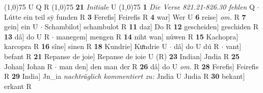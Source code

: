 \documentclass[8pt,a4paper,notitlepage]{article}
\begin{document}
\begin{table}[ht]
\begin{minipage}[t]{0.5\linewidth}
\scriptsize
\line(1,0){75} \newline
U Q R \newline
\line(1,0){75} \newline
\textbf{21} \textit{Initiale} U  \newline
\line(1,0){75} \newline
\textbf{1} \textit{Die Verse 821.21-826.30 fehlen} Q   $\cdot$ Lútte ein teil sẏ funden R \textbf{3} Ferefis] Feirefis R \textbf{4} war] Wer U \textbf{6} reise] \textit{om.} R \textbf{7} gein] ein U  $\cdot$ Schambilot] schambulot R \textbf{11} daz] Do R \textbf{12} gescheiden] geschiden R \textbf{13} dâ] do U R  $\cdot$ manegem] mengen R \textbf{14} niht wan] núwen R \textbf{15} Kachopra] karcopra R \textbf{16} sîne] sinen R \textbf{18} Kundrie] Kuͦndrie U  $\cdot$ dâ] do U dú R  $\cdot$ vant] befant R \textbf{21} Repanse de joie] Repanse de ioie U (R) \textbf{23} Indian] Jndia R \textbf{25} Johan] Iohan R  $\cdot$ man den] den man der R \textbf{26} dâ] do U \textit{om.} R \textbf{28} Ferefis] Feirefis R \textbf{29} India] Jn_ia \textit{nachträglich kommentiert zu:} Jndia U Jndia R \textbf{30} bekant] erkant R \newline
\end{minipage}
\end{table}
\end{document}
